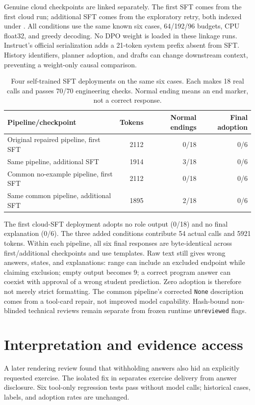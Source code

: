 Genuine cloud checkpoints are linked separately. The first SFT comes from the first cloud run; additional SFT comes from the exploratory retry, both indexed under . All conditions use the same known six cases, 64/192/96 budgets, CPU float32, and greedy decoding. No DPO weight is loaded in these linkage runs. Instruct's official serialization adds a 21-token system prefix absent from SFT. History identifiers, planner adoption, and drafts can change downstream context, preventing a weight-only causal comparison.

\begin{table}[htbp]\centering\small
\caption{Four self-trained SFT deployments on the same six cases. Each makes 18 real calls and passes 70/70 engineering checks. Normal ending means an end marker, not a correct response.}\label{tab:concise-agents-sft}
\begin{tabularx}{\linewidth}{@{}Yrrr@{}}\toprule
Pipeline/checkpoint & Tokens & Normal endings & Final adoption\\\midrule
Original repaired pipeline, first SFT &2112&0/18&0/6\\
Same pipeline, additional SFT &1914&3/18&0/6\\
Common no-example pipeline, first SFT &2112&0/18&0/6\\
Same common pipeline, additional SFT &1895&2/18&0/6\\\bottomrule
\end{tabularx}
\end{table}\FloatBarrier

The first cloud-SFT deployment adopts no role output (0/18) and no final explanation (0/6). The three added conditions contribute 54 actual calls and 5921 tokens. Within each pipeline, all six final responses are byte-identical across first/additional checkpoints and use templates. Raw text still gives wrong answers, states, and explanations: range can include an excluded endpoint while claiming exclusion; empty output becomes 9; a correct program answer can coexist with approval of a wrong student prediction. Zero adoption is therefore not merely strict formatting. The common pipeline's corrected \texttt{None} description comes from a tool-card repair, not improved model capability. Hash-bound non-blinded technical reviews remain separate from frozen runtime \texttt{unreviewed} flags.

\section{Interpretation and evidence access}
A later rendering review found that withholding answers also hid an explicitly requested exercise. The isolated fix in  separates exercise delivery from answer disclosure. Six tool-only regression tests pass without model calls; historical cases, labels, and adoption rates are unchanged.

